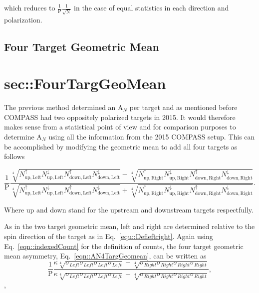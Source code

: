 \noindent
which reduces to $\frac{1}{\mathrm{P}}\frac{1}{\sqrt{\mathrm{N}}}$ in the case
of equal statistics in each direction and polarization.

\subsection{Four Target Geometric Mean} \section{sec::FourTargGeoMean}
The previous method determined an A$_N$ per target and as mentioned before
COMPASS had two oppositely polarized targets in 2015.  It would therefore makes
sense from a statistical point of view and for comparison purposes to determine
A$_N$ using all the information from the 2015 COMPASS setup.  This can be
accomplished by modifying the geometric mean to add all four targets as follows

\begin{equation}
  \label{eqn::AN4TargGeomean}
  \frac{1}{\mathrm{P}}
  \frac{
    \sqrt[4]{
      N_{\mathrm{up,Left}}^{\uparrow}N_{\mathrm{up, Left}}^{\downarrow}
      N_{\mathrm{down,Left}}^{\uparrow}N_{\mathrm{down, Left}}^{\downarrow}
    } -
    \sqrt[4]{
      N_{\mathrm{up,Right}}^{\uparrow}N_{\mathrm{up, Right}}^{\downarrow}
      N_{\mathrm{down,Right}}^{\uparrow}N_{\mathrm{down, Right}}^{\downarrow}
    }
  }{
    \sqrt[4]{
      N_{\mathrm{up,Left}}^{\uparrow}N_{\mathrm{up, Left}}^{\downarrow}
      N_{\mathrm{down,Left}}^{\uparrow}N_{\mathrm{down, Left}}^{\downarrow}
    } +
    \sqrt[4]{
      N_{\mathrm{up,Right}}^{\uparrow}N_{\mathrm{up, Right}}^{\downarrow}
      N_{\mathrm{down,Right}}^{\uparrow}N_{\mathrm{down, Right}}^{\downarrow}
    }
  }.
\end{equation}

\noindent
Where up and down stand for the upstream and downstream targets respectfully.

As in the two target geometric mean, left and right are determined relative to
the spin direction of the target as in Eq.~\ref{equ::Defleftright}.  Again using
Eq.~\ref{eqn::indexedCount} for the definition of counts, the four target
geometric mean asymmetry, Eq.~\ref{eqn::AN4TargGeomean}, can be written as
\begin{equation}
  \frac{1}{\mathrm{P}}
  \frac{
    \kappa \sqrt[4]{\sigma_{Left}\sigma_{Left}\sigma_{Left}\sigma_{Left}} -
    \sqrt[4]{\sigma_{Right}\sigma_{Right}\sigma_{Right}\sigma_{Right}}
  }{
    \kappa \sqrt[4]{\sigma_{Left}\sigma_{Left}\sigma_{Left}\sigma_{Left}} +
    \sqrt[4]{\sigma_{Right}\sigma_{Right}\sigma_{Right}\sigma_{Right}}
  },
\end{equation},

